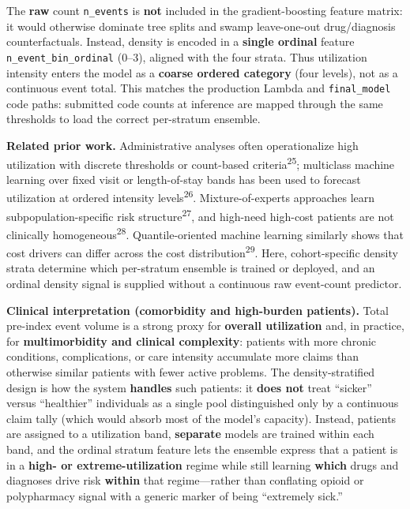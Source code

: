 \documentclass[
  12pt,
]{book}
\begin{document}
The \textbf{raw} count \texttt{n\_events} is \textbf{not} included in
the gradient-boosting feature matrix: it would otherwise dominate tree
splits and swamp leave-one-out drug/diagnosis counterfactuals. Instead,
density is encoded in a \textbf{single ordinal} feature
\texttt{n\_event\_bin\_ordinal} (0--3), aligned with the four strata.
Thus utilization intensity enters the model as a \textbf{coarse ordered
category} (four levels), not as a continuous event total. This matches
the production Lambda and \texttt{final\_model} code paths: submitted
code counts at inference are mapped through the same thresholds to load
the correct per-stratum ensemble.

\textbf{Related prior work.} Administrative analyses often
operationalize high utilization with discrete thresholds or count-based
criteria\textsuperscript{25}; multiclass machine learning over fixed
visit or length-of-stay bands has been used to forecast utilization at
ordered intensity levels\textsuperscript{26}. Mixture-of-experts
approaches learn subpopulation-specific risk
structure\textsuperscript{27}, and high-need high-cost patients are not
clinically homogeneous\textsuperscript{28}. Quantile-oriented machine
learning similarly shows that cost drivers can differ across the cost
distribution\textsuperscript{29}. Here, cohort-specific density strata
determine which per-stratum ensemble is trained or deployed, and an
ordinal density signal is supplied without a continuous raw event-count
predictor.

\textbf{Clinical interpretation (comorbidity and high-burden patients).}
Total pre-index event volume is a strong proxy for \textbf{overall
utilization} and, in practice, for \textbf{multimorbidity and clinical
complexity}: patients with more chronic conditions, complications, or
care intensity accumulate more claims than otherwise similar patients
with fewer active problems. The density-stratified design is how the
system \textbf{handles} such patients: it \textbf{does not} treat
``sicker'' versus ``healthier'' individuals as a single pool
distinguished only by a continuous claim tally (which would absorb most
of the model's capacity). Instead, patients are assigned to a
utilization band, \textbf{separate} models are trained within each band,
and the ordinal stratum feature lets the ensemble express that a patient
is in a \textbf{high- or extreme-utilization} regime while still
learning \textbf{which} drugs and diagnoses drive risk \textbf{within}
that regime---rather than conflating opioid or polypharmacy signal with
a generic marker of being ``extremely sick.''
\end{document}
